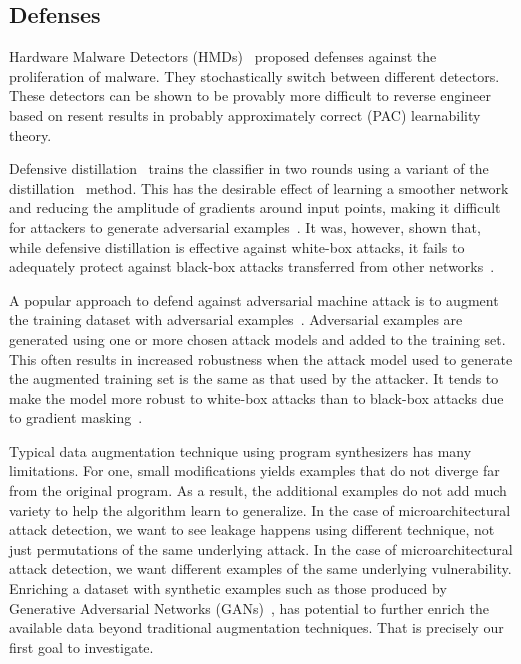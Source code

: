 \subsection{Defenses}

 Hardware Malware Detectors (HMDs)~\cite{RHMD2017} proposed defenses against the proliferation of malware. They stochastically switch between different detectors. These detectors can be shown to be provably more difficult to
reverse engineer based on resent results in probably approximately
correct (PAC) learnability theory. 

Defensive distillation~\cite{papernot2016distillation} trains the classifier in two rounds using a variant of the
distillation~\cite{hinton2015distilling} method. This has the desirable effect of learning a smoother network
and reducing the amplitude of gradients around input points, making it difficult for attackers to
generate adversarial examples~\cite{papernot2016distillation}. It was, however, shown that, while defensive
distillation is effective against white-box attacks, it fails to adequately protect against black-box
attacks transferred from other networks~\cite{Carlini2017}.

A popular approach to defend against adversarial machine attack is to augment the training dataset with adversarial examples~\cite{szegedy2014going, Goodfellow2015ADVexample, moosavidezfooli2016deepfool}. Adversarial examples are generated using one or more chosen attack models and added to the training
set. This often results in increased robustness when the attack model used to generate the augmented
training set is the same as that used by the attacker. It tends to make the model more robust to white-box attacks than to black-box attacks due to gradient masking~\cite{Papernot2016TowardsTS, tramer2020ensemble}.






Typical data augmentation technique using program synthesizers has many limitations. For one, small modifications yields examples that do not diverge far from the original program. As a result, the additional examples do not add much variety to help the algorithm learn to generalize. In the case of microarchitectural attack detection, we want to see leakage happens using different technique, not just permutations of the same underlying attack.
In the case of microarchitectural attack detection, we want different examples of the same underlying vulnerability. Enriching a dataset with synthetic examples such as those produced by Generative Adversarial Networks (GANs)~\cite{goodfellow2014generative}, has potential to further enrich the available data beyond traditional augmentation techniques. That is precisely our first goal to investigate. 

